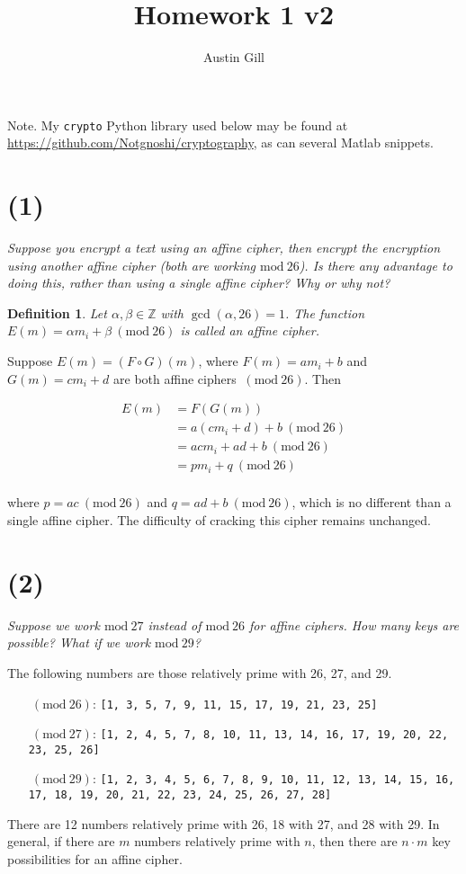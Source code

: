 \documentclass[12pt]{article}
\title{Homework 1 v2}
\author{Austin Gill}
\renewcommand{\mod}[1]{\mathrm{mod}\ #1}
\renewcommand{\pmod}[1]{\ (\mod{#1})}
\newtheorem*{defn}{Definition}
\begin{document}
    \maketitle

    Note. My \texttt{crypto} Python library used below may be found at \url{https://github.com/Notgnoshi/cryptography}, as can several Matlab snippets.
\section*{(1)} \textit{Suppose you encrypt a text using an affine cipher, then encrypt the encryption using another affine cipher (both are working $\mod{26}$). Is there any advantage to doing this, rather than using a single affine cipher? Why or why not?}

    \begin{defn}
    Let $\alpha , \beta \in \mathbb Z$ with $\gcd(\alpha , 26) = 1$. The function $E(m) = \alpha m_i + \beta \pmod{26}$ is called an affine cipher.
    \end{defn}

    Suppose $E(m) = (F \circ G)(m)$, where $F(m) = am_i + b$ and $G(m) = cm_i + d$ are both affine ciphers $\pmod{26}$. Then

    \begin{align*}
        E(m) &= F(G(m))\\
             &= a(cm_i + d) + b \pmod{26}\\
             &= acm_i + ad + b \pmod{26}\\
             &= pm_i + q \pmod{26}\\
    \end{align*}

    where $p = ac \pmod{26}$ and $q = ad + b \pmod{26}$, which is no different than a single affine cipher. The difficulty of cracking this cipher remains unchanged.

\section*{(2)} \textit{Suppose we work $\mod{27}$ instead of $\mod{26}$ for affine ciphers. How many keys are possible? What if we work $\mod{29}$?}

    The following numbers are those relatively prime with 26, 27, and 29.
    \begin{itemize}
      \item[$\pmod{26}$:]
      \texttt{[1, 3, 5, 7, 9, 11, 15, 17, 19, 21, 23, 25]}
      \item[$\pmod{27}$:]
      \texttt{[1, 2, 4, 5, 7, 8, 10, 11, 13, 14, 16, 17, 19, 20, 22, 23, 25, 26]}
      \item[$\pmod{29}$:]
      \texttt{[1, 2, 3, 4, 5, 6, 7, 8, 9, 10, 11, 12, 13, 14, 15, 16, 17, 18, 19, 20, 21, 22, 23, 24, 25, 26, 27, 28]}
    \end{itemize}
    There are 12 numbers relatively prime with 26, 18 with 27, and 28 with 29. In general, if there are $m$ numbers relatively prime with $n$, then there are $n\cdot m$ key possibilities for an affine cipher.
\end{document}
